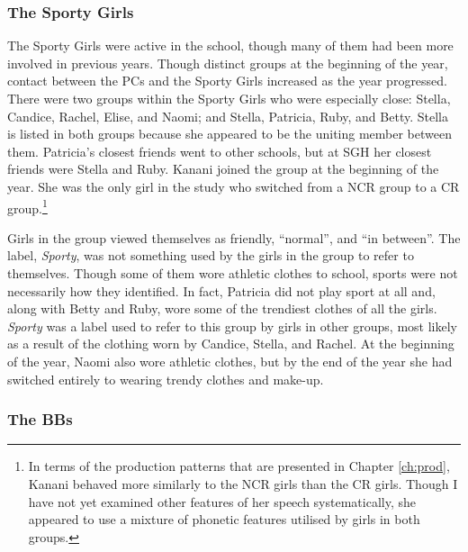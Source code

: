 \subsubsection{The Sporty Girls}
The Sporty Girls were active in the school, though many of them had been more involved in previous years.  Though distinct groups at the beginning of the year, contact between the PCs and the Sporty Girls increased as the year progressed.  There were two groups within the Sporty Girls who were especially close: Stella, Candice, Rachel, Elise, and Naomi; and Stella, Patricia, Ruby, and Betty.  Stella is listed in both groups because she appeared to be the uniting member between them.  Patricia's closest friends went to other schools, but at SGH her closest friends were Stella and Ruby.  Kanani joined the group at the beginning of the year.  She was the only girl in the study who switched from a NCR group to a CR group.\footnote{In terms of the production patterns that are presented in Chapter \ref{ch:prod}, Kanani behaved more similarly to the NCR girls than the CR girls.  Though I have not yet examined other features of her speech systematically, she appeared to use a mixture of phonetic features utilised by girls in both groups.}

Girls in the group viewed themselves as friendly, ``normal'', and ``in between''.  The label, \textsl{Sporty}, was not something used by the girls in the group to refer to themselves.  Though some of them wore athletic clothes to school, sports were not necessarily how they identified.  In fact, Patricia did not play sport at all and, along with Betty and Ruby, wore some of the trendiest clothes of all the girls.  \textit{Sporty} was a label used to refer to this group by girls in other groups, most likely as a result of the clothing worn by Candice, Stella, and Rachel.  At the beginning of the year, Naomi also wore athletic clothes, but by the end of the year she had switched entirely to wearing trendy clothes and make-up.

\pagebreak
\subsubsection{The BBs}
\label{ex:pamodette}

